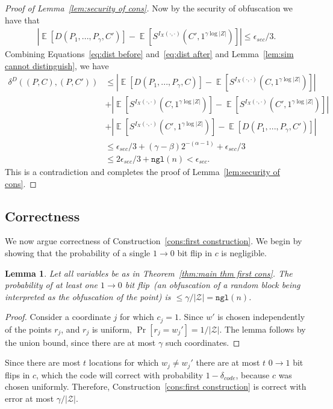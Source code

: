 \documentclass[11pt]{article}
\newcommand{\thref}[1]{\mbox{Theorem~\ref{#1}}}
\newcommand{\lemref}[1]{\mbox{Lemma~\ref{#1}}}
\newcommand{\consref}[1]{\mbox{Construction~\ref{#1}}}
\DeclareMathOperator*{\expe}{\mathbb{E}}
\newcommand{\dis}{\ensuremath{\mathsf{dis}}}
\newcommand{\ngl}{\ensuremath{\mathtt{ngl}}\xspace}
\newtheorem{lemma}[theorem]{Lemma}
\begin{document}
\begin{proof}[Proof of \lemref{lem:security of cons}]
\noindent Now by the security of obfuscation we have that
\begin{align}
\label{eq:dist after}
|\expe [D(P_1,..., P_\gamma, C') ]- \expe [S^{I_X(\cdot, \cdot)}(C', 1^{\gamma \log |Z|})] |\leq \epsilon_{sec}/3.
\end{align}
Combining Equations~\ref{eq:dist before} and~\ref{eq:dist after} and \lemref{lem:sim cannot distinguish}, we have
\begin{align*}
\delta^{D}(( P, C), (P, C'))&\leq |\expe [D(P_1,..., P_\gamma, C)] - \expe [S^{I_X(\cdot, \cdot)}(C, 1^{\gamma \log |Z|})]| \\
&+|\expe[S^{I_X(\cdot, \cdot)}(C, 1^{\gamma \log |Z|})] - \expe[S^{I_X(\cdot, \cdot)}(C', 1^{\gamma \log |Z|})] |\\
&+|\expe [S^{I_X(\cdot, \cdot)}(C', 1^{\gamma \log |Z|})] - \expe [D(P_1,..., P_\gamma, C') ]|\\
&\leq \epsilon_{sec}/3+ (\gamma-\beta)2^{-(\alpha-1)}+\epsilon_{sec}/3 \\
&\leq 2\epsilon_{sec}/3 + \ngl(n) < \epsilon_{sec}.
\end{align*}
This is a contradiction and completes the proof of \lemref{lem:security of cons}.
\end{proof}

\subsection{Correctness}
We now argue correctness of \consref{cons:first construction}.
We begin by showing that the probability of a single $1\rightarrow 0$ bit flip in $c$ is negligible.
\begin{lemma}
\label{lem:no 1 to 0 flips}
Let all variables be as in \thref{thm:main thm first cons}.
The probability of at least one $1\rightarrow 0$ bit flip~(an obfuscation of a random block being interpreted as the obfuscation of the point) is $ \le \gamma/|\mathcal{Z}| = \ngl(n)$.
\end{lemma}
\begin{proof}
Consider a coordinate $j$ for which $c_j=1$. Since $w'$ is chosen independently of the points $r_j$, and $r_j$ is uniform, $\Pr[r_j =w_j']  = 1/|\mathcal{Z}|$. The lemma follows by the union bound, since there are at most $\gamma$ such coordinates.
\end{proof}

Since there are most $t$ locations for which $w_j\neq w_j'$ there are at most $t$ $0\rightarrow 1$ bit flips in $c$, which the code will correct with probability $1-\delta_{code}$, because $c$ was chosen uniformly.
Therefore, \consref{cons:first construction} is correct with error at most $\gamma/|\mathcal{Z}|$.
\end{document}
